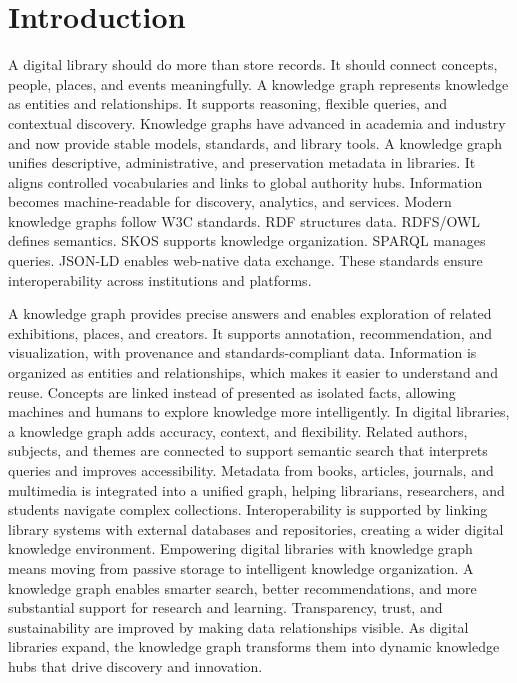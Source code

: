 \documentclass[12pt,a4paper]{article}
\begin{document}
\section{Introduction}
A digital library should do more than store records. It should connect concepts, people, places, and events meaningfully. A knowledge graph represents knowledge as entities and relationships. It supports reasoning, flexible queries, and contextual discovery. Knowledge graphs have advanced in academia and industry and now provide stable models, standards, and library tools. A knowledge graph unifies descriptive, administrative, and preservation metadata in libraries. It aligns controlled vocabularies and links to global authority hubs. Information becomes machine-readable for discovery, analytics, and services. Modern knowledge graphs follow W3C standards. RDF structures data. RDFS/OWL defines semantics. SKOS supports knowledge organization. SPARQL manages queries. JSON-LD enables web-native data exchange. These standards ensure interoperability across institutions and platforms.

A knowledge graph provides precise answers and enables exploration of related exhibitions, places, and creators. It supports annotation, recommendation, and visualization, with provenance and standards-compliant data. Information is organized as entities and relationships, which makes it easier to understand and reuse. Concepts are linked instead of presented as isolated facts, allowing machines and humans to explore knowledge more intelligently. In digital libraries, a knowledge graph adds accuracy, context, and flexibility. Related authors, subjects, and themes are connected to support semantic search that interprets queries and improves accessibility. Metadata from books, articles, journals, and multimedia is integrated into a unified graph, helping librarians, researchers, and students navigate complex collections. Interoperability is supported by linking library systems with external databases and repositories, creating a wider digital knowledge environment. Empowering digital libraries with knowledge graph means moving from passive storage to intelligent knowledge organization. A knowledge graph enables smarter search, better recommendations, and more substantial support for research and learning. Transparency, trust, and sustainability are improved by making data relationships visible. As digital libraries expand, the knowledge graph transforms them into dynamic knowledge hubs that drive discovery and innovation.
\end{document}
